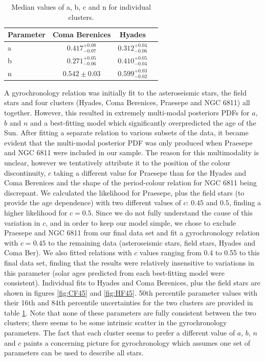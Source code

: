 \documentclass[useAMS, usenatbib]{mn2e}
\begin{document}
\begin{table}
\caption{Median values of a, b, c and n for individual clusters.
\label{tab:cluster_results}}

\begin{center}
\begin{tabular}{lccc}
\hline\hline
{Parameter} & {Coma Berenices} & {Hyades} \\
\hline
a & $0.417^{+0.08}_{-0.07}$ & $0.312^{+0.04}_{-0.06}$ \\
b & $0.271^{+0.05}_{-0.06}$ & $0.410^{+0.05}_{-0.04}$ \\
n & $0.542 \pm 0.03$ & $0.599^{+0.03}_{-0.02}$ \\
\hline
\end{tabular}
\end{center}
\end{table}

A gyrochronology relation was initially fit to the asteroseismic stars, the
field stars and four clusters (Hyades, Coma Berenices, Praesepe and NGC 6811)
all together.
However, this resulted in extremely multi-modal posteriors PDFs for
$a$, $b$ and $n$ and a best-fitting model which significantly overpredicted
the age of the Sun.
After fitting a separate relation to various subsets of the data, it became
evident that the multi-modal posterior PDF was only produced when Praesepe and
NGC 6811 were included in our sample.
The reason for this multimodality is unclear, however we tentatively attribute
it to the position of the colour discontinuity, $c$ taking a different value
for Praesepe than for the Hyades and Coma Berenices and the shape of the
period-colour relation for NGC 6811 being discrepant.
We calculated the likelihood for Praesepe, plus the field stars (to provide
the age dependence) with two different values of $c$: $0.45$ and $0.5$,
finding a higher likelihood for $c=0.5$.
Since we do not fully understand the cause of this variation in $c$, and in
order to keep our model simple, we chose to exclude Praesepe and NGC 6811 from
our final data set and fit a gyrochronology relation with $c=0.45$ to the
remaining data (asteroseismic stars, field stars, Hyades and Coma Ber).
We also fitted relations with $c$ values ranging from 0.4 to 0.55 to this final
data set, finding that the results were relatively insensitive to variations
in this parameter (solar ages predicted from each best-fitting model were
consistent).
Individual fits to Hyades and Coma Berenices, plus the field stars are shown
in figures \ref{fig:CF45} and \ref{fig:HF45}.
50th percentile parameter values with their 16th and 84th
percentile uncertainties for the two clusters are provided in table
\ref{tab:cluster_results}.
Note that none of these parameters are fully consistent between the two
clusters; there seems to be some intrinsic scatter in the gyrochronology
parameters.
The fact that each cluster seems to prefer a different value of $a$, $b$, $n$
and $c$ paints a concerning picture for gyrochronology which assumes one set
of parameters can be used to describe all stars.
\end{document}
